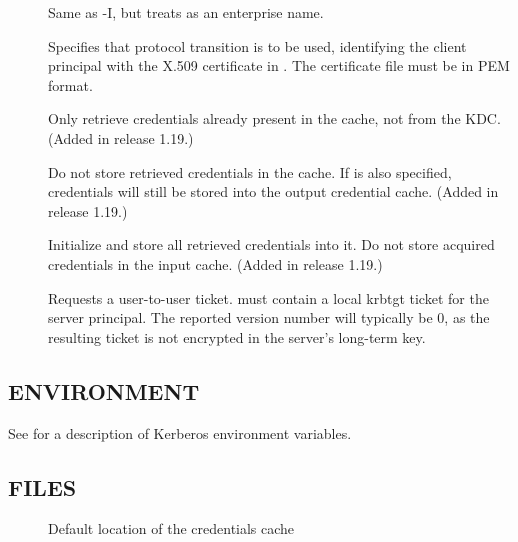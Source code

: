 \documentclass[letterpaper,10pt,english]{sphinxmanual}
\begin{document}
\begin{description}
\item[{ }] \leavevmode
Same as -I, but treats  as an enterprise name.

\item[{ }] \leavevmode
Specifies that protocol transition is to be used, identifying the
client principal with the X.509 certificate in .  The
certificate file must be in PEM format.

\item[{}] \leavevmode
Only retrieve credentials already present in the cache, not from
the KDC.  (Added in release 1.19.)

\item[{}] \leavevmode
Do not store retrieved credentials in the cache.  If
 is also specified, credentials will still be
stored into the output credential cache.  (Added in release 1.19.)

\item[{ }] \leavevmode
Initialize  and store all retrieved credentials into it.
Do not store acquired credentials in the input cache.  (Added in
release 1.19.)

\item[{ }] \leavevmode
Requests a user-to-user ticket.   must contain a local
krbtgt ticket for the server principal.  The reported version
number will typically be 0, as the resulting ticket is not
encrypted in the server’s long-term key.

\end{description}


\subsection{ENVIRONMENT}
\label{\detokenize{user/user_commands/kvno:environment}}
See {\hyperref[\detokenize{user/user_config/kerberos:kerberos-7}]{}} for a description of Kerberos environment
variables.


\subsection{FILES}
\label{\detokenize{user/user_commands/kvno:files}}\begin{description}
\item[{}] \leavevmode
Default location of the credentials cache

\end{description}
\end{document}
